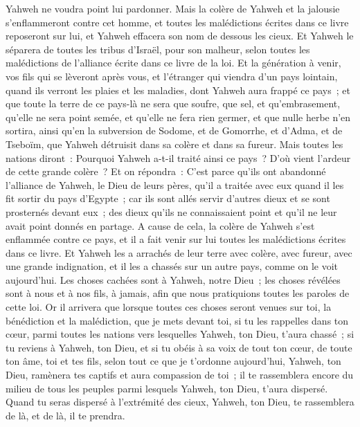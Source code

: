 \begin{multicols}{2}
Yahweh ne voudra point lui pardonner. Mais la colère de Yahweh et la jalousie s'enflammeront contre cet homme, et toutes les malédictions écrites dans ce livre reposeront sur lui, et Yahweh effacera son nom de dessous les cieux.
Et Yahweh le séparera de toutes les tribus d'Israël, pour son malheur, selon toutes les malédictions de l'alliance écrite dans ce livre de la loi.
Et la génération à venir, vos fils qui se lèveront après vous, et l'étranger qui viendra d'un pays lointain, quand ils verront les plaies et les maladies, dont Yahweh aura frappé ce pays~;
et que toute la terre de ce pays-là ne sera que soufre, que sel, et qu'embrasement, qu'elle ne sera point semée, et qu'elle ne fera rien germer, et que nulle herbe n'en sortira, ainsi qu'en la subversion de Sodome, et de Gomorrhe, et d'Adma, et de Tseboïm, que Yahweh détruisit dans sa colère et dans sa fureur.
Mais toutes les nations diront~: Pourquoi Yahweh a-t-il traité ainsi ce pays~? D'où vient l'ardeur de cette grande colère~?
Et on répondra~: C'est parce qu'ils ont abandonné l'alliance de Yahweh, le Dieu de leurs pères, qu'il a traitée avec eux quand il les fit sortir du pays d'Egypte~;
car ils sont allés servir d'autres dieux et se sont prosternés devant eux~; des dieux qu'ils ne connaissaient point et qu'il ne leur avait point donnés en partage.
A cause de cela, la colère de Yahweh s'est enflammée contre ce pays, et il a fait venir sur lui toutes les malédictions écrites dans ce livre.
Et Yahweh les a arrachés de leur terre avec colère, avec fureur, avec une grande indignation, et il les a chassés sur un autre pays, comme on le voit aujourd'hui.
Les choses cachées sont à Yahweh, notre Dieu~; les choses révélées sont à nous et à nos fils, à jamais, afin que nous pratiquions toutes les paroles de cette loi.
\VerseOne{}Or il arrivera que lorsque toutes ces choses seront venues sur toi, la bénédiction et la malédiction, que je mets devant toi, si tu les rappelles dans ton cœur, parmi toutes les nations vers lesquelles Yahweh, ton Dieu, t'aura chassé~;
si tu reviens à Yahweh, ton Dieu, et si tu obéis à sa voix de tout ton cœur, de toute ton âme, toi et tes fils, selon tout ce que je t'ordonne aujourd'hui,
Yahweh, ton Dieu, ramènera tes captifs et aura compassion de toi~; il te rassemblera encore du milieu de tous les peuples parmi lesquels Yahweh, ton Dieu, t'aura dispersé.
Quand tu seras dispersé à l'extrémité des cieux, Yahweh, ton Dieu, te rassemblera de là, et de là, il te prendra.

\end{multicols}
